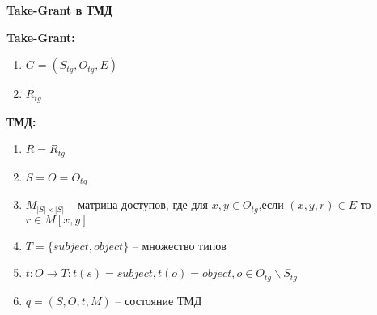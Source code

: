 \textbf{Take-Grant в ТМД}

	\textbf{Take-Grant:}
	\begin{multicols}{2}
		\begin{enumerate}
			\item $G=(S_{tg}, O_{tg}, E)$
			\item $R_{tg}$
		\end{enumerate}
	\end{multicols}

	\textbf{ТМД:}

	\begin{multicols}{2}
		\begin{enumerate}
			\item $R = R_{tg}$
			\item $S = O = O_{tg}$
			\item $M_{|S| \times |S|}$ -- матрица доступов, где для $x,y \in O_{tg}$,если $(x, y, r) \in E$ то $r \in M[x,y]$
			\item $T = \{subject, object\}$ -- множество типов
			\item $t: O \to T : t(s) = subject, t(o) = object, o \in O_{tg} \backslash S_{tg}$
			\item $q = (S, O, t, M)$ -- состояние ТМД
		\end{enumerate}
	\end{multicols}



